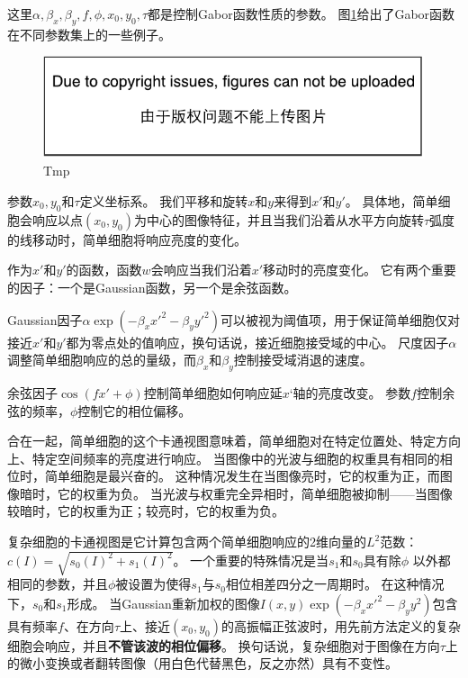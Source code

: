 这里$\alpha, \beta_x, \beta_y, f, \phi, x_0, y_0, \tau$都是控制Gabor函数性质的参数。
图\ref{fig:chap9_Gabor_functions}给出了Gabor函数在不同参数集上的一些例子。
\begin{figure}
\ifOpenSource
\centerline{\includegraphics{figure.pdf}}
\else
\centering    
{}     
\fi
\caption{Tmp}     
\label{fig:chap9_Gabor_functions}     
\end{figure}

参数$x_0,y_0$和$\tau$定义坐标系。
我们平移和旋转$x$和$y$来得到$x'$和$y'$。
具体地，简单细胞会响应以点$(x_0, y_0)$为中心的图像特征，并且当我们沿着从水平方向旋转$\tau$弧度的线移动时，简单细胞将响应亮度的变化。
 
 
作为$x'$和$y'$的函数，函数$w$会响应当我们沿着$x'$移动时的亮度变化。
它有两个重要的因子：一个是Gaussian函数，另一个是余弦函数。

Gaussian因子$ \alpha \exp(-\beta_x x'^2 - \beta_y y'^2)$可以被视为阈值项，用于保证简单细胞仅对接近$x'$和$y'$都为零点处的值响应，换句话说，接近细胞接受域的中心。
尺度因子$\alpha$调整简单细胞响应的总的量级，而$\beta_x$和$\beta_y$控制接受域消退的速度。

余弦因子$ \cos (fx' + \phi)$控制简单细胞如何响应延$x‘$轴的亮度改变。
参数$f$控制余弦的频率，$\phi$控制它的相位偏移。

合在一起，简单细胞的这个卡通视图意味着，简单细胞对在特定位置处、特定方向上、特定空间频率的亮度进行响应。
当图像中的光波与细胞的权重具有相同的相位时，简单细胞是最兴奋的。
这种情况发生在当图像亮时，它的权重为正，而图像暗时，它的权重为负。
当光波与权重完全异相时，简单细胞被抑制——当图像较暗时，它的权重为正；较亮时，它的权重为负。
 
 
复杂细胞的卡通视图是它计算包含两个简单细胞响应的2维向量的$L^2$范数：$c(I)=\sqrt{s_0(I)^2 + s_1(I)^2}$。
一个重要的特殊情况是当$s_1$和$s_0$具有除$\phi$ 以外都相同的参数，并且$\phi$被设置为使得$s_1$与$s_0$相位相差四分之一周期时。
在这种情况下，$s_0$和$s_1$形成。
当Gaussian重新加权的图像$I(x,y)\exp(-\beta_x x'^2 -\beta_y y^2)$包含具有频率$f$、在方向$\tau$上、接近$(x_0, y_0)$的高振幅正弦波时，用先前方法定义的复杂细胞会响应，并且\textbf{不管该波的相位偏移}。
换句话说，复杂细胞对于图像在方向$\tau$上的微小变换或者翻转图像（用白色代替黑色，反之亦然）具有不变性。

